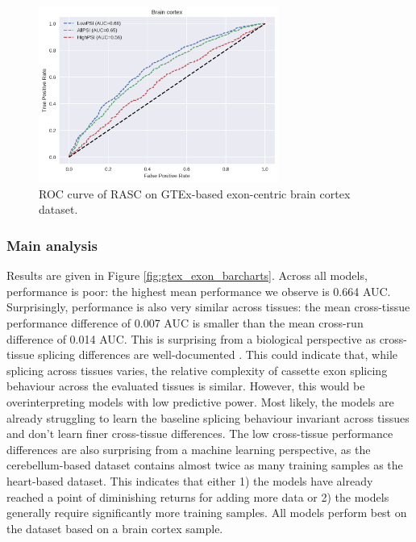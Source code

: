 \begin{figure}
	\centering\includegraphics[width=0.7\textwidth]{../visualizations/ch5-results/gtex_exon_brain_roc.png} 
	\caption{
	ROC curve of RASC on GTEx-based exon-centric brain cortex dataset. 
  }
	\label{fig:gtex_exon_roc}
\end{figure}
\subsubsection{Main analysis}
Results are given in Figure \ref{fig:gtex_exon_barcharts}. Across all models, performance is poor: the highest mean performance we observe is 0.664 AUC. Surprisingly, performance is also very similar across tissues: the mean cross-tissue performance difference of 0.007 AUC is smaller than the mean cross-run difference of 0.014 AUC. This is surprising from a biological perspective as cross-tissue splicing differences are well-documented \cite{crosstissuesplicing}. 
This could indicate that, while splicing across tissues varies, the relative complexity of cassette exon splicing behaviour across the evaluated tissues is similar. However, this would be overinterpreting models with low predictive power.
Most likely, the models are already struggling to learn the baseline splicing behaviour invariant across tissues and don't learn finer cross-tissue differences. 
The low cross-tissue performance differences are also surprising from a machine learning perspective, as the cerebellum-based dataset contains almost twice as many training samples as the heart-based dataset. This indicates that either 1) the models have already reached a point of diminishing returns for adding more data or 2) the models generally require significantly more training samples. All models perform best on the dataset based on a brain cortex sample. 

